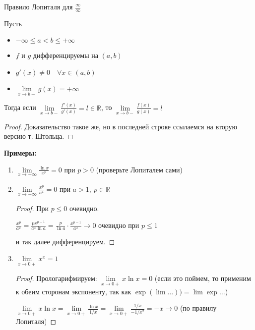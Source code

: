 \begin{theorem-non}
    Правило Лопиталя для $\frac{\infty}{\infty}$

    Пусть 
    \begin{itemize}
        \item $-\infty \leq a < b \leq +\infty$
        \item $f$ и $g$ дифференцируемы на $(a, b)$
        \item $g'(x) \neq 0 \quad \forall x \in (a, b)$
        \item $\lim\limits_{x \rightarrow b-} g(x) = +\infty$
    \end{itemize}
    Тогда если $\lim\limits_{x \rightarrow b-}\frac{f'(x)}{g'(x)} = l \in \mathbb{R}$, 
    то $\lim\limits_{x \rightarrow b-}\frac{f(x)}{g(x)} = l$

\end{theorem-non}
\begin{proof}
    Доказательство такое же, но в последней строке ссылаемся на вторую версию т. Штольца. 
\end{proof}

\textbf{Примеры:}

\begin{enumerate}
    \item $\lim\limits_{x \rightarrow +\infty} \frac{\ln x}{x^p} = 0$ при $p > 0$ (проверьте Лопиталем сами)
    \item $\lim\limits_{x \rightarrow +\infty} \frac{x^p}{a^x} = 0$ при $a > 1, \ p \in \mathbb{R}$
    \begin{proof}
        При $p \leq 0$ очевидно.

        $\frac{x^p}{a^x} = \frac{px^{p-1}}{a^x \ln a} = \frac{p}{\ln a} \cdot \frac{x^{p-1}}{a^x} \longrightarrow 0$ очевидно при $p \leq 1$

        и так далее дифференцируем.
    \end{proof}
    \item $\lim\limits_{x \rightarrow 0+} x^x = 1$
    \begin{proof}
        Прологарифмируем: $\lim\limits_{x \rightarrow 0+} x \ln x = 0$ 
        (если это поймем, то применим к обеим сторонам экспоненту, так как $\exp(\lim \dots)) = \lim \exp \dots$)

        $\lim\limits_{x \rightarrow 0+} x \ln x = \lim\limits_{x \rightarrow 0+} \frac{\ln x}{1/x} = \lim\limits_{x \rightarrow 0+} \frac{1/x}{-1/x^2} = -x \longrightarrow 0$ (по правилу Лопиталя)
    \end{proof}
\end{enumerate}

